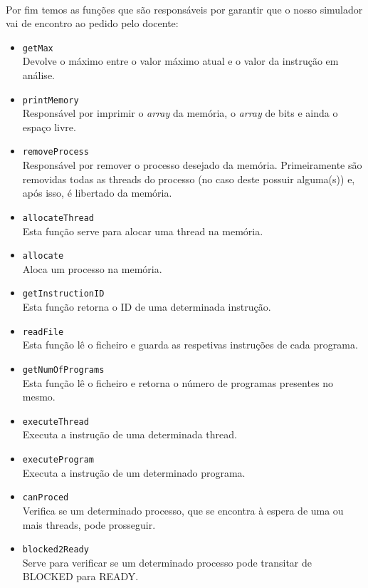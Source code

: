 \documentclass{article}
\begin{document}
\paragraph{}
Por fim temos as funções que são responsáveis por garantir que o nosso simulador vai de encontro ao pedido pelo docente:
\begin{itemize}
    \item \verb|getMax|\\
    Devolve o máximo entre o valor máximo atual e o valor da instrução em análise.
    \item \verb|printMemory|\\
    Responsável por imprimir o \textit{array} da memória, o \textit{array} de bits e ainda o espaço livre.
    \item \verb|removeProcess|\\
    Responsável por remover o processo desejado da memória. Primeiramente são removidas todas as threads do processo (no caso deste possuir alguma(s)) e, após isso, é libertado da memória.
    \item \verb|allocateThread|\\
    Esta função serve para alocar uma thread na memória.
    \item \verb|allocate|\\
    Aloca um processo na memória.
    \item \verb|getInstructionID|\\
    Esta função retorna o ID de uma determinada instrução.
    \item \verb|readFile|\\
    Esta função lê o ficheiro e guarda as respetivas instruções de cada programa. 
    \item \verb|getNumOfPrograms|\\
    Esta função lê o ficheiro e retorna o número de programas presentes no mesmo.
    \item \verb|executeThread|\\
    Executa a instrução de uma determinada thread.
    \item \verb|executeProgram|\\
    Executa a instrução de um determinado programa.
    \item \verb|canProced|\\
    Verifica se um determinado processo, que se encontra à espera de uma ou mais threads, pode prosseguir.
    \item \verb|blocked2Ready|\\
    Serve para verificar se um determinado processo pode transitar de BLOCKED para READY.

\end{itemize}
\end{document}
